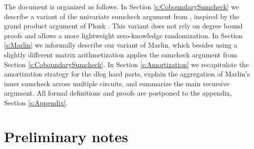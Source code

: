 \documentclass[10pt,article,oneside]{memoir}
\theoremstyle{definition}
\theoremstyle{remark}
\begin{document}
The document is organized as follows. 
In Section \ref{s:CoboundarySumcheck} we describe a variant of the univariate sumcheck argument from \cite{Aurora, Marlin}, inspired by the grand product argument of Plonk \cite{Plonk}. 
This variant does not rely on degree bound proofs and allows a more lightweight zero-knowledge randomization. 
In Section \ref{s:Marlin} we informally describe our variant of Marlin, which besides using a slightly different matrix arithmetization applies the sumcheck argument from Section \ref{s:CoboundarySumcheck}.
In Section \ref{s:Amortization} we recapitulate the amortization strategy for the dlog hard parts, explain the aggregation of Marlin's inner sumcheck across multiple circuits, and summarize the main recursive argument.
All formal definitions and proofs are postponed to the appendix, Section \ref{s:Appendix}.

 






%

\chapter{Preliminary notes}

\end{document}
